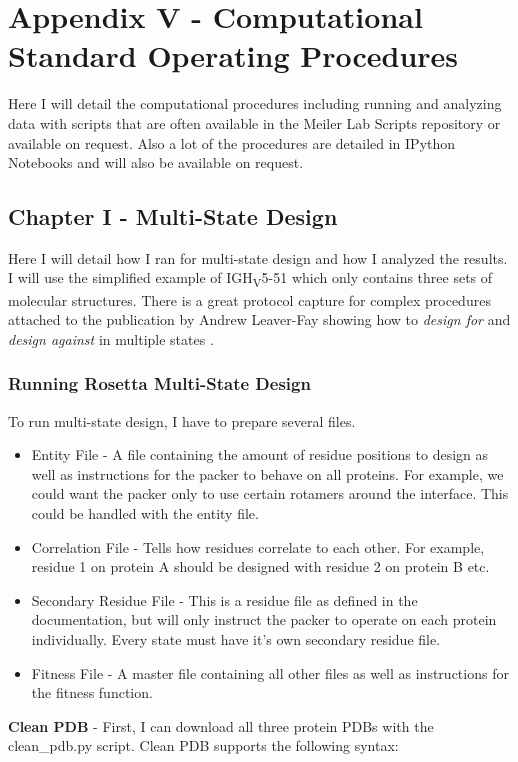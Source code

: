 \section{Appendix V - Computational Standard Operating Procedures}
\label{sec:appenixV}
Here I will detail the computational procedures including running \rosetta and analyzing data with scripts that are often available in the Meiler Lab Scripts repository or available on request. Also a lot of the procedures are detailed in IPython Notebooks and will also be available on request.
\subsection{Chapter I - Multi-State Design}
Here I will detail how I ran \rosettadesign for multi-state design and how I analyzed the results. I will use the simplified example of IGH\textsubscript{V}5-51 which only contains three sets of molecular structures. There is a great protocol capture for complex procedures attached to the publication by Andrew Leaver-Fay showing how to \textit{design for} and \textit{design against} in multiple states \citep{LeaverFay:2011ji}.
\subsubsection{Running Rosetta Multi-State Design}
To run multi-state design, I have to prepare several files.

\begin{itemize}
\item Entity File - A file containing the amount of residue positions to design as well as instructions for the packer to behave on all proteins. For example, we could want the packer only to use certain rotamers around the interface. This could be handled with the entity file.
\item Correlation File - Tells how residues correlate to each other. For example, residue 1 on protein A should be designed with residue 2 on protein B etc.
\item Secondary Residue File - This is a residue file as defined in the documentation, but will only instruct the packer to operate on each protein individually. Every state must have it's own secondary residue file.
\item Fitness File - A master file containing all other files as well as instructions for the fitness function.
\end{itemize}

\textbf{Clean PDB} - First, I can download all three protein PDBs with the clean\_pdb.py script. Clean PDB supports the following syntax:

